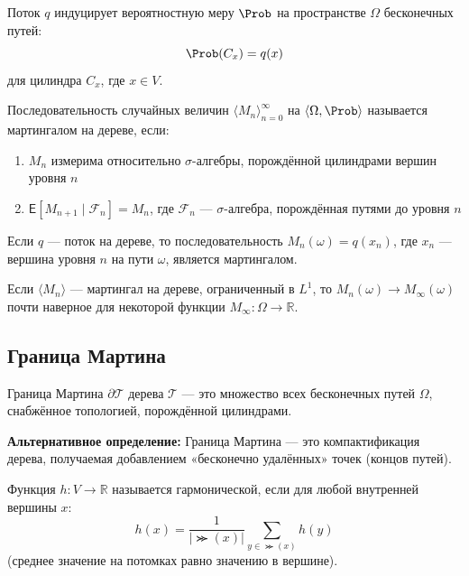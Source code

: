 \documentclass[11pt, a4paper]{extarticle}
\newcommand{\si}{\sigma}
\newcommand{\om}{\omega}
\newcommand{\Om}{\Omega}
\newcommand{\Fcal}{{\mathcal F}}
\newcommand{\Tcal}{{\mathcal T}}
\newcommand{\E}{{\mathsf E}}
\newcommand{\R}{{\mathbb R}}
\renewcommand{\P}{\Prob}
\begin{document}
\begin{definition}
Поток $q$ индуцирует вероятностную меру $\P$ на пространстве $\Om$ бесконечных путей:
$$\P(C_x) = q(x)$$
для цилиндра $C_x$, где $x \in V$.
\end{definition}

\begin{definition}
Последовательность случайных величин $\langle M_n \rangle_{n=0}^\infty$ на $\langle \Om, \P \rangle$ называется мартингалом на дереве, если:
\begin{enumerate}
    \item $M_n$ измерима относительно $\si$-алгебры, порождённой цилиндрами вершин уровня $n$
    \item $\E[M_{n+1} \mid \Fcal_n] = M_n$, где $\Fcal_n$ --- $\si$-алгебра, порождённая путями до уровня $n$
\end{enumerate}
\end{definition}

\begin{theorem}
Если $q$ --- поток на дереве, то последовательность $M_n(\om) = q(x_n)$, где $x_n$ --- вершина уровня $n$ на пути $\om$, является мартингалом.
\end{theorem}

\begin{theorem}
Если $\langle M_n \rangle$ --- мартингал на дереве, ограниченный в $L^1$, то $M_n(\om) \to M_\infty(\om)$ почти наверное для некоторой функции $M_\infty: \Om \to \R$.
\end{theorem}

\subsection{Граница Мартина}

\begin{definition}
Граница Мартина $\partial \Tcal$ дерева $\Tcal$ --- это множество всех бесконечных путей $\Om$, снабжённое топологией, порождённой цилиндрами.

\textbf{Альтернативное определение:} Граница Мартина --- это компактификация дерева, получаемая добавлением «бесконечно удалённых» точек (концов путей).
\end{definition}

\begin{definition}
Функция $h: V \to \R$ называется гармонической, если для любой внутренней вершины $x$:
$$h(x) = \frac{1}{|\Succ(x)|} \sum_{y \in \Succ(x)} h(y)$$
(среднее значение на потомках равно значению в вершине).
\end{definition}
\end{document}
